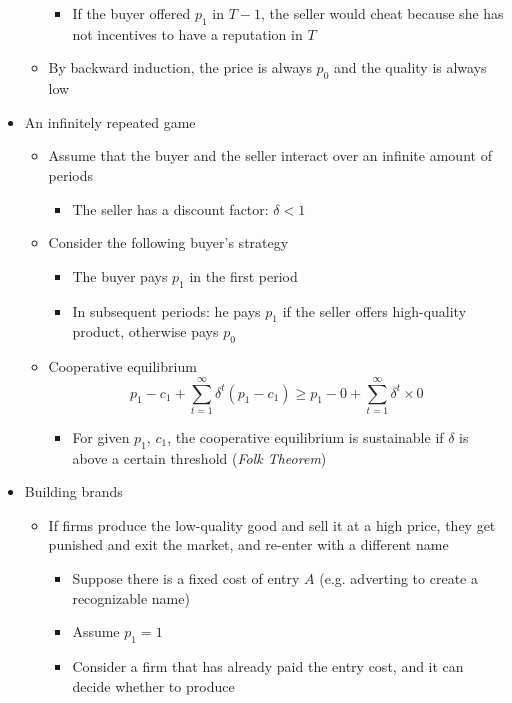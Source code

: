 \documentclass[a4paper]{article}
\begin{document}
\begin{itemize}
\begin{itemize}
\begin{itemize}
            \item If the buyer offered $p_1$ in $T-1$, the seller would cheat because she has not incentives to have a reputation in $T$
        \end{itemize}
        \item By backward induction, the price is always $p_0$ and the quality is always low
    \end{itemize}
    \item An infinitely repeated game
    \begin{itemize}
        \item Assume that the buyer and the seller interact over an infinite amount of periods
        \begin{itemize}
            \item The seller has a discount factor: $\delta<1$
        \end{itemize}
        \item Consider the following buyer's strategy
        \begin{itemize}
            \item The buyer pays $p_1$ in the first period
            \item In subsequent periods: he pays $p_1$ if the seller offers high-quality product, otherwise pays $p_0$
        \end{itemize}
        \item Cooperative equilibrium
        \[p_1-c_1+\sum_{t=1}^{\infty}\delta^t(p_1-c_1)\geq p_1-0+\sum_{t=1}^{\infty}\delta^t\times0 \]
        \begin{itemize}
            \item For given $p_1$, $c_1$, the cooperative equilibrium is sustainable if $\delta$ is above a certain threshold (\textit{Folk Theorem})
        \end{itemize}
    \end{itemize}
    \item Building brands
    \begin{itemize}
        \item If firms produce the low-quality good and sell it at a high price, they get punished and exit the market, and re-enter with a different name
        \begin{itemize}
            \item Suppose there is a fixed cost of entry $A$ (e.g. adverting to create a recognizable name)
            \item Assume $p_1=1$
            \item Consider a firm that has already paid the entry cost, and it can decide whether to produce

\end{itemize}
\end{itemize}
\end{itemize}
\end{document}
